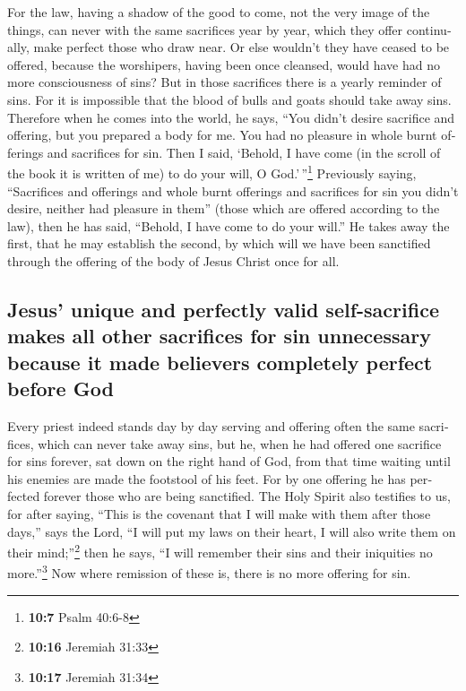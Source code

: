\begin{paracol}{2}
\begin{otherlanguage}{english}
 For the law, having a shadow of the good to come, not the
very image of the things, can never with the same sacrifices year by
year, which they offer continually, make perfect those who draw near.
 Or else wouldn't they have ceased to be offered, because
the worshipers, having been once cleansed, would have had no more
consciousness of sins?  But in those sacrifices there is a
yearly reminder of sins.  For it is impossible that the
blood of bulls and goats should take away sins.  Therefore
when he comes into the world, he says, ``You didn't desire sacrifice and
offering, but you prepared a body for me.  You had no
pleasure in whole burnt offerings and sacrifices for sin. 
Then I said, `Behold, I have come (in the scroll of the book it is
written of me) to do your will, O God.'\,''\footnote{\textbf{10:7} Psalm
  40:6-8}  Previously saying, ``Sacrifices and offerings
and whole burnt offerings and sacrifices for sin you didn't desire,
neither had pleasure in them'' (those which are offered according to the
law),  then he has said, ``Behold, I have come to do your
will.'' He takes away the first, that he may establish the second,
 by which will we have been sanctified through the
offering of the body of Jesus Christ once for all.

\hypertarget{jesus-unique-and-perfectly-valid-self-sacrifice-makes-all-other-sacrifices-for-sin-unnecessary-because-it-made-believers-completely-perfect-before-god}{%
\subsection{Jesus' unique and perfectly valid self-sacrifice makes all
other sacrifices for sin unnecessary because it made believers
completely perfect before
God}\label{jesus-unique-and-perfectly-valid-self-sacrifice-makes-all-other-sacrifices-for-sin-unnecessary-because-it-made-believers-completely-perfect-before-god}}

 Every priest indeed stands day by day serving and
offering often the same sacrifices, which can never take away sins,
 but he, when he had offered one sacrifice for sins
forever, sat down on the right hand of God,  from that
time waiting until his enemies are made the footstool of his feet.
 For by one offering he has perfected forever those who
are being sanctified.  The Holy Spirit also testifies to
us, for after saying,  ``This is the covenant that I will
make with them after those days,'' says the Lord, ``I will put my laws
on their heart, I will also write them on their mind;''\footnote{\textbf{10:16}
  Jeremiah 31:33} then he says,  ``I will remember their
sins and their iniquities no more.''\footnote{\textbf{10:17} Jeremiah
  31:34}  Now where remission of these is, there is no
more offering for sin.


\end{otherlanguage}
\end{paracol}
